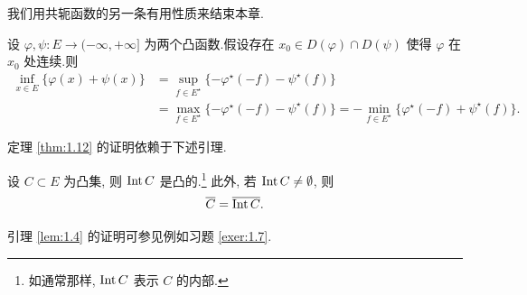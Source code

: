 我们用共轭函数的另一条有用性质来结束本章.

\begin{startheorem}
\label{thm:1.12}
设 $\varphi,\psi:E\to(-\infty,+\infty]$ 为两个凸函数.假设存在
$x_0\in D(\varphi)\cap D(\psi)$ 使得 $\varphi$ 在 $x_0$ 处连续.则
\begin{align*}
\inf_{x\in E}\{\varphi(x)+\psi(x)\}
&= \sup_{f\in E^\star}\{-\varphi^\star(-f)-\psi^\star(f)\}\\
&= \max_{f\in E^\star}\{-\varphi^\star(-f)-\psi^\star(f)\}
 = -\min_{f\in E^\star}\{\varphi^\star(-f)+\psi^\star(f)\}.
\end{align*}
\end{startheorem}

定理  \ref{thm:1.12} 的证明依赖于下述引理.

\begin{lemma}
\label{lem:1.4}
设 $C\subset E$ 为凸集, 则 $\operatorname{Int} C$ 是凸的.\footnote{如通常那样, $\operatorname{Int} C$ 表示 $C$
的内部.} 此外, 若 $\operatorname{Int} C\ne\emptyset$, 则
\begin{equation*}
\overline{C}=\overline{\operatorname{Int} C}.
\end{equation*}
\end{lemma}

引理  \ref{lem:1.4} 的证明可参见例如习题  \ref{exer:1.7}.

